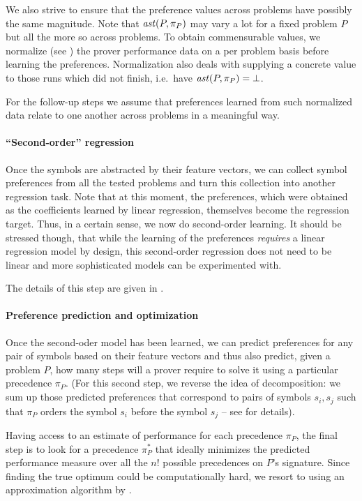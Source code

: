 We also strive to ensure that the preference values across problems have possibly the same magnitude.
Note that \(\operatorname{\mathit{ast}}(P,\pi_P)\) may vary a lot for a fixed problem \(P\) but all the more so across
problems. To obtain commensurable values, we normalize
(see ) the prover performance data
on a per problem basis before learning the preferences. Normalization also deals with
supplying a concrete value to those runs which did not finish, i.e.~have \(\operatorname{\mathit{ast}}(P,\pi_P) = \bot\).

For the follow-up steps we assume that preferences learned from such normalized data relate to one another
across problems in a meaningful way.

\paragraph{``Second-order'' regression}
Once the symbols are abstracted by their feature vectors, we can collect symbol preferences from all the tested problems
and turn this collection into another regression task. 
Note that at this moment, the preferences, which were obtained as the coefficients learned by linear regression,
themselves become the regression target. Thus, in a certain sense, we now do second-order learning.
It should be stressed though, that while the learning of the preferences \emph{requires} a linear regression model by design,
this second-order regression does not need to be linear and more sophisticated models can be experimented with. 

The details of this step are given in .

\paragraph{Preference prediction and optimization} Once the second-oder model has been learned, we can predict 
preferences for any pair of symbols based on their feature vectors and thus also predict,
given a problem $P$, how many steps will a prover require to solve it using a particular precedence $\pi_P$.
(For this second step, we reverse the idea of decomposition:
we sum up those predicted preferences that correspond to pairs of symbols $s_i,s_j$
such that $\pi_P$ orders the symbol $s_i$ before the symbol $s_j$ -- see  for details).

Having access to an estimate of performance for each precedence $\pi_P$, the final step 
is to look for a precedence $\pi^*_P$ that ideally minimizes the predicted performance measure 
over all the $n!$ possible precedences on $P$'s signature. Since finding the true
optimum could be computationally hard, we resort to using an approximation algorithm by \citet{Cohen2011}.

